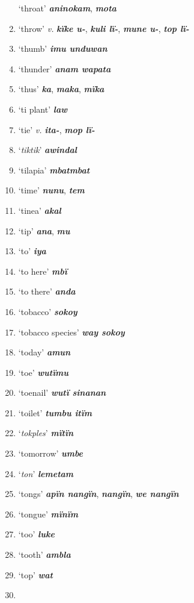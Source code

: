 \begin{enumerate}[noitemsep, label={}, align=left, widest=190, labelsep=1ex,leftmargin=*,itemindent=-10pt]
‘throat’ \textbf{\textit{aninokam}}, \textbf{\textit{mota}} \item
‘throw’ \textit{v.} \textbf{\textit{kïke u-}}, \textbf{\textit{kuli lï-}}, \textbf{\textit{mune u-}}, \textbf{\textit{top lï-}} \item
‘thumb’ \textbf{\textit{imu unduwan}} \item
‘thunder’ \textbf{\textit{anam wapata}} \item
‘thus’ \textbf{\textit{ka}}, \textbf{\textit{maka}}, \textbf{\textit{mïka}} \item
‘ti plant’ \textbf{\textit{law}} \item
‘tie’ \textit{v.} \textbf{\textit{ita-}}, \textbf{\textit{mop lï-}} \item
‘\textit{tiktik}’ \textbf{\textit{awindal}} \item
‘tilapia’ \textbf{\textit{mbatmbat}} \item
‘time’ \textbf{\textit{nunu}}, \textbf{\textit{tem}} \item
‘tinea’ \textbf{\textit{akal}} \item
‘tip’ \textbf{\textit{ana}}, \textbf{\textit{mu}} \item
‘to’ \textbf{\textit{iya}} \item
‘to here’ \textbf{\textit{mbï}} \item
‘to there’ \textbf{\textit{anda}} \item
‘tobacco’ \textbf{\textit{sokoy}} \item
‘tobacco species’ \textbf{\textit{way sokoy}} \item
‘today’ \textbf{\textit{amun}} \item
‘toe’ \textbf{\textit{wutïmu}} \item
‘toenail’ \textbf{\textit{wutï sinanan}} \item
‘toilet’ \textbf{\textit{tumbu itïm}} \item
‘\textit{tokples}’ \textbf{\textit{mïtïn}} \item
‘tomorrow’ \textbf{\textit{umbe}} \item
‘\textit{ton}’ \textbf{\textit{lemetam}} \item
‘tongs’ \textbf{\textit{apïn nangïn}}, \textbf{\textit{nangïn}}, \textbf{\textit{we nangïn}} \item
‘tongue’ \textbf{\textit{mïnïm}} \item
‘too’ \textbf{\textit{luke}} \item
‘tooth’ \textbf{\textit{ambla}} \item
‘top’ \textbf{\textit{wat}} \item

\end{enumerate}
